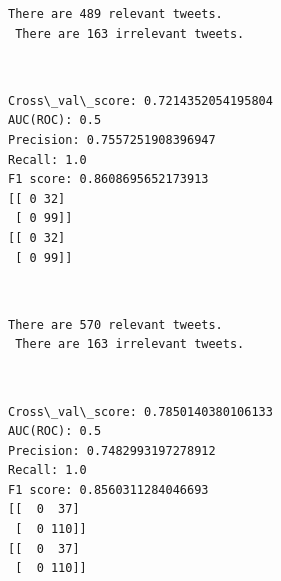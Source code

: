 \documentclass[11pt]{article}
\begin{document}
    \begin{Verbatim}[commandchars=\\\{\}]
There are 489 relevant tweets.
 There are 163 irrelevant tweets.

    \end{Verbatim}

    \begin{center}
    \end{center}
    { \hspace*{\fill} \\}
    
    \begin{Verbatim}[commandchars=\\\{\}]
Cross\_val\_score: 0.7214352054195804
AUC(ROC): 0.5
Precision: 0.7557251908396947
Recall: 1.0
F1 score: 0.8608695652173913
[[ 0 32]
 [ 0 99]]
[[ 0 32]
 [ 0 99]]

    \end{Verbatim}

    \begin{center}
    \end{center}
    { \hspace*{\fill} \\}
    
    \begin{Verbatim}[commandchars=\\\{\}]
There are 570 relevant tweets.
 There are 163 irrelevant tweets.

    \end{Verbatim}

    \begin{center}
    \end{center}
    { \hspace*{\fill} \\}
    
    \begin{Verbatim}[commandchars=\\\{\}]
Cross\_val\_score: 0.7850140380106133
AUC(ROC): 0.5
Precision: 0.7482993197278912
Recall: 1.0
F1 score: 0.8560311284046693
[[  0  37]
 [  0 110]]
[[  0  37]
 [  0 110]]

    \end{Verbatim}

    \begin{center}
    \end{center}
    { \hspace*{\fill} \\}
    
\end{document}
